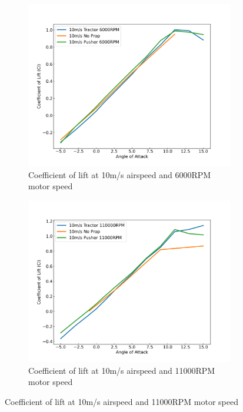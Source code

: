 \begin{figure}[H]
    \centering
    \begin{subfigure}[b]{0.467\textwidth}
        \centering
        \includegraphics[width=\textwidth]{05_Results/Figs/Cl/10ms_6000RPM_Cl.png}
        \caption{Coefficient of lift at 10m/s airspeed and 6000RPM motor speed}
        \label{fig:Cl_10ms_6000}
    \end{subfigure}
    \begin{subfigure}[b]{0.467\textwidth}
        \centering
        \includegraphics[width=\textwidth]{05_Results/Figs/Cl/10ms_110000RPM_Cl.png}
        \caption{Coefficient of lift at 10m/s airspeed and 11000RPM motor speed}

\end{subfigure}
\end{figure}

